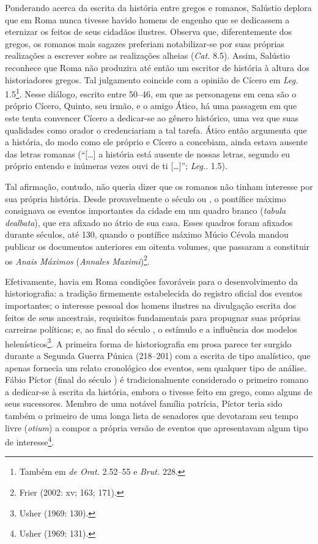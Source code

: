  Ponderando acerca da escrita da história entre gregos e romanos, Salústio
 deplora que em Roma nunca tivesse havido homens de engenho que se dedicassem a
 eternizar os feitos de seus cidadãos ilustres. Observa que, diferentemente dos
 gregos, os romanos mais sagazes preferiam notabilizar-se por suas próprias
 realizações a escrever sobre as realizações alheias (\emph{Cat.} 8.5). Assim,
 Salústio reconhece que Roma não produzira até então um escritor de história à
 altura dos historiadores gregos. Tal julgamento coincide com a opinião de
 Cícero em \emph{Leg.} 1.5\footnote{Também em \emph{de Orat.} 2.52--55 e \emph{Brut.} 228.}.  Nesse diálogo, escrito entre
 50--46, em que as personagens em cena são o próprio Cícero, Quinto, seu irmão,
 e o amigo Ático, há uma passagem em que este tenta convencer Cícero a
 dedicar-se ao gênero histórico, uma vez que suas qualidades como orador o
 credenciariam a tal tarefa.  Ático então argumenta que a história, do modo
 como ele próprio e Cícero a concebiam, ainda estava ausente das letras romanas
 (“[\ldots{}] a história está ausente de nossas letras, segundo eu próprio entendo e
 inúmeras vezes ouvi de ti [\ldots{}]”;  \emph{Leg.}. 1.5). 

Tal afirmação, contudo, não queria dizer que os romanos não tinham interesse
por sua própria história. Desde provavelmente o século  ou , o  
pontífice máximo consignava os eventos importantes da cidade em um quadro branco
(\emph{tabula dealbata}), que era afixado no átrio de sua casa. Esses quadros
foram afixados durante séculos, até 130,  quando o  pontífice máximo Múcio
Cévola mandou publicar os documentos anteriores em oitenta volumes, que
passaram a constituir os \emph{Anais Máximos} (\emph{Annales
Maximi})\footnote{Frier (2002: xv; 163; 171).}. 

Efetivamente, havia em Roma condições favoráveis para o desenvolvimento da
historiografia: a tradição firmemente estabelecida do registro oficial dos
eventos importantes; o interesse pessoal dos homens ilustres na divulgação
escrita dos feitos de seus ancestrais, requisitos fundamentais para propugnar
suas próprias carreiras políticas; e, ao final do século , o estímulo
e a influência dos modelos helenísticos\footnote{Usher (1969: 130).}.    A
primeira forma de historiografia em prosa parece ter surgido durante a Segunda
Guerra Púnica (218--201) com a escrita de tipo analístico, que apenas fornecia um relato cronológico dos
eventos, sem qualquer tipo de análise. Fábio Píctor (final do século ) 
é tradicionalmente considerado o primeiro romano a dedicar-se à escrita da história,
embora o tivesse feito em grego, como alguns de seus sucessores. Membro de uma
notável família patrícia, Píctor teria sido também o primeiro de uma longa
lista de senadores que devotaram seu tempo livre (\emph{otium}) a compor a
própria versão de eventos que apresentavam algum tipo de
interesse\footnote{Usher (1969: 131).}.

